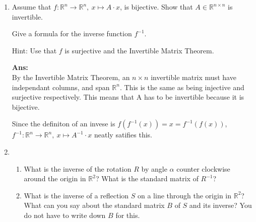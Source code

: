 \documentclass[12pt,a4paper]{amsart}
\newcommand{\R}{\mathbb{R}}
\newcommand\sol[1]{
\medskip
\begin{mdframed}
\textbf{Ans:\\} #1
\end{mdframed}
\medskip
}
\begin{document}
\begin{enumerate}
\sol{
  \begin{enumerate}
    \item
      Since A is already in echelon form, if there were to be a zero in one of the diagonals, this would mean that there would not be a pivot in every column.
      This in turn would mean that there would be a free variable, which would prevent the matrix from being reduced to the identity if it were put into reduced row echelon form.
    \item
      Since the identity has zeroes below all of its ones, it is already triangular. 
      When we row reduce $[A,I_n]$, all the opperations will be adding lower rows to rows above them to create zeroes above the pivots.
      In the identity matrix, this will create numbers only above the diagonal, meaning that it will reamain an upper triangular matrix.
      Thus the inverse of $A$ must also be an upper triangular matrix.
  \end{enumerate}
}
\item
Assume that $f\colon \R^n\to \R^n,\ x\mapsto A\cdot x$, is bijective. Show that $A\in \R^{n\times n}$ is invertible.

Give a formula for the inverse function $f^{-1}$.

Hint: Use that $f$ is surjective and the Invertible Matrix Theorem.

\sol{
  By the Invertible Matrix Theorem, an $n\times n$ invertible matrix must have independant columns, and span $\R^n$. This is the same as being injective and surjective respectively. 
  This means that A has to be invertible because it is bijective.\\\smallskip

  Since the definiton of an invese is $f(f^{-1}(x))=x=f^{-1}(f(x))$, $f^{-1}\colon \R^n\to \R^n, \ x\mapsto A^{-1}\cdot x$ neatly satifies this.
}

\item
\begin{enumerate}
\item
 What is the inverse of the rotation $R$ by angle $\alpha$ counter clockwise around the origin in $\R^2$?
 What is the standard matrix of $R^{-1}$?
\item
 What is the inverse of a reflection $S$ on a line through the origin in $\R^2$? What can you say about the standard matrix
 $B$ of $S$ and its inverse? You do not have to write down $B$ for this. 
\end{enumerate}


\end{enumerate}
\end{document}
